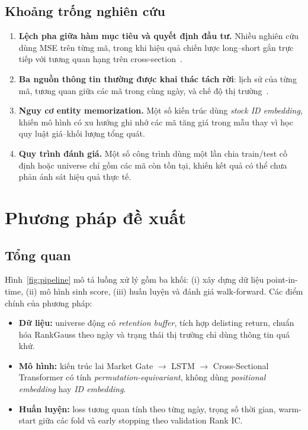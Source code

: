 \documentclass[a4paper,12pt]{article}
\begin{document}
\subsection{Khoảng trống nghiên cứu}
\begin{enumerate}
    \item \textbf{Lệch pha giữa hàm mục tiêu và quyết định đầu tư.} Nhiều nghiên cứu dùng MSE trên từng mã, trong khi hiệu quả chiến lược long--short gắn trực tiếp với tương quan hạng trên cross-section~\cite{Poh2021}.
    \item \textbf{Ba nguồn thông tin thường được khai thác tách rời}: lịch sử của từng mã, tương quan giữa các mã trong cùng ngày, và chế độ thị trường~\cite{Li2024MASTER}.
    \item \textbf{Nguy cơ entity memorization.} Một số kiến trúc dùng \textit{stock ID embedding}, khiến mô hình có xu hướng ghi nhớ các mã tăng giá trong mẫu thay vì học quy luật giá--khối lượng tổng quát.
    \item \textbf{Quy trình đánh giá.} Một số công trình dùng một lần chia train/test cố định hoặc universe chỉ gồm các mã còn tồn tại, khiến kết quả có thể chưa phản ánh sát hiệu quả thực tế.
\end{enumerate}

\newpage
\section{Phương pháp đề xuất}\label{sec:method}

\subsection{Tổng quan}
Hình~\ref{fig:pipeline} mô tả luồng xử lý gồm ba khối: (i) xây dựng dữ liệu point-in-time, (ii) mô hình sinh score, (iii) huấn luyện và đánh giá walk-forward. Các điểm chính của phương pháp:
\begin{itemize}
    \item \textbf{Dữ liệu:} universe động có \textit{retention buffer}, tích hợp delisting return, chuẩn hóa RankGauss theo ngày và trạng thái thị trường chỉ dùng thông tin quá khứ.
    \item \textbf{Mô hình:} kiến trúc lai Market Gate $\to$ LSTM $\to$ Cross-Sectional Transformer có tính \textit{permutation-equivariant}, không dùng \textit{positional embedding} hay \textit{ID embedding}.
    \item \textbf{Huấn luyện:} loss tương quan tính theo từng ngày, trọng số thời gian, warm-start giữa các fold và early stopping theo validation Rank IC.
\end{itemize}
\end{document}
